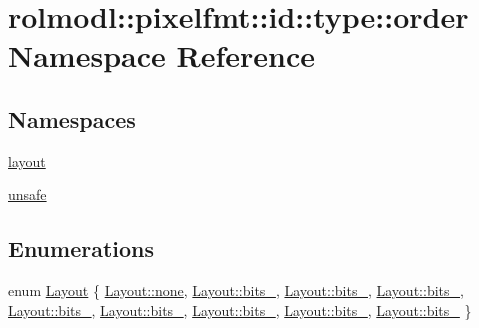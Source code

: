 \hypertarget{namespacerolmodl_1_1pixelfmt_1_1id_1_1type_1_1order}{}\section{rolmodl\+::pixelfmt\+::id\+::type\+::order Namespace Reference}
\label{namespacerolmodl_1_1pixelfmt_1_1id_1_1type_1_1order}
\subsection*{Namespaces}
\begin{DoxyCompactItemize}
\item 
 \mbox{\hyperlink{namespacerolmodl_1_1pixelfmt_1_1id_1_1type_1_1order_1_1layout}{layout}}
\item 
 \mbox{\hyperlink{namespacerolmodl_1_1pixelfmt_1_1id_1_1type_1_1order_1_1unsafe}{unsafe}}
\end{DoxyCompactItemize}
\subsection*{Enumerations}
\begin{DoxyCompactItemize}
\item 
enum \mbox{\hyperlink{namespacerolmodl_1_1pixelfmt_1_1id_1_1type_1_1order_a4177275b82f1923d1a2f07e1f87f0391}{Layout}} \{ \newline
\mbox{\hyperlink{namespacerolmodl_1_1pixelfmt_1_1id_1_1type_1_1order_a4177275b82f1923d1a2f07e1f87f0391a334c4a4c42fdb79d7ebc3e73b517e6f8}{Layout\+::none}}, 
\mbox{\hyperlink{namespacerolmodl_1_1pixelfmt_1_1id_1_1type_1_1order_a4177275b82f1923d1a2f07e1f87f0391a048e7d2511b1dc3c817475caec59284c}{Layout\+::bits\+\_}}, 
\mbox{\hyperlink{namespacerolmodl_1_1pixelfmt_1_1id_1_1type_1_1order_a4177275b82f1923d1a2f07e1f87f0391a399aa6d3bc23e17267ff3c6689b8358c}{Layout\+::bits\+\_}}, 
\mbox{\hyperlink{namespacerolmodl_1_1pixelfmt_1_1id_1_1type_1_1order_a4177275b82f1923d1a2f07e1f87f0391aa6fa24ed990ef1b7b37fcbec087234f2}{Layout\+::bits\+\_}}, 
\newline
\mbox{\hyperlink{namespacerolmodl_1_1pixelfmt_1_1id_1_1type_1_1order_a4177275b82f1923d1a2f07e1f87f0391afed06c33ec3b5025b2d159bf9e1fdd5a}{Layout\+::bits\+\_}}, 
\mbox{\hyperlink{namespacerolmodl_1_1pixelfmt_1_1id_1_1type_1_1order_a4177275b82f1923d1a2f07e1f87f0391a4e1f41d3d898aff49c6fd4180fcc0c47}{Layout\+::bits\+\_}}, 
\mbox{\hyperlink{namespacerolmodl_1_1pixelfmt_1_1id_1_1type_1_1order_a4177275b82f1923d1a2f07e1f87f0391a868604f62354bdea417e746877c19c06}{Layout\+::bits\+\_}}, 
\mbox{\hyperlink{namespacerolmodl_1_1pixelfmt_1_1id_1_1type_1_1order_a4177275b82f1923d1a2f07e1f87f0391a823533134c313b5e61521482174fc5ad}{Layout\+::bits\+\_}}, 
\newline
\mbox{\hyperlink{namespacerolmodl_1_1pixelfmt_1_1id_1_1type_1_1order_a4177275b82f1923d1a2f07e1f87f0391a3f377a83f585aa9fb9be0ee47d330ffd}{Layout\+::bits\+\_}}
 \}
\end{DoxyCompactItemize}
